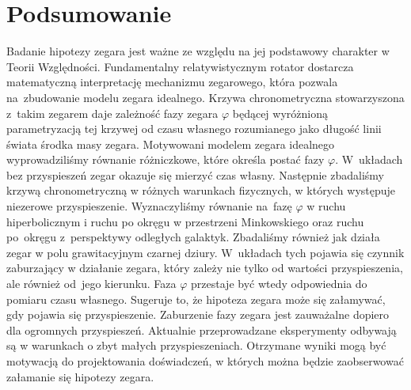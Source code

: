 \section{Podsumowanie}
Badanie hipotezy zegara jest ważne ze względu na jej 
podstawowy charakter w Teorii Względności. 
Fundamentalny relatywistycznym rotator dostarcza matematyczną 
interpretację mechanizmu zegarowego, która pozwala na~zbudowanie 
modelu zegara idealnego. Krzywa chronometryczna stowarzyszona z~takim 
zegarem daje zależność fazy zegara $\varphi$ będącej 
wyróżnioną parametryzacją tej krzywej od czasu własnego
rozumianego jako długość linii świata środka masy zegara.
Motywowani modelem zegara idealnego wyprowadziliśmy równanie różniczkowe, 
które określa postać fazy $\varphi$. 
W~układach bez przyspieszeń zegar okazuje się mierzyć czas własny. 
Następnie zbadaliśmy krzywą chronometryczną w różnych warunkach fizycznych,
w których występuje niezerowe przyspieszenie. Wyznaczyliśmy równanie na~fazę 
$\varphi$ w ruchu hiperbolicznym i 
ruchu po okręgu 
w przestrzeni Minkowskiego oraz
ruchu po~okręgu z~perspektywy odległych galaktyk. Zbadaliśmy
 również jak działa zegar w polu grawitacyjnym czarnej dziury.
W~układach tych pojawia się czynnik zaburzający w działanie zegara,
który zależy nie tylko od wartości przyspieszenia, ale również 
od~jego kierunku.
Faza $\varphi$ przestaje być wtedy odpowiednia do pomiaru 
 czasu własnego. Sugeruje to, że hipoteza zegara może 
się załamywać, gdy pojawia się przyspieszenie. 
Zaburzenie fazy zegara jest zauważalne dopiero dla
 ogromnych przyspieszeń.
Aktualnie przeprowadzane eksperymenty odbywają są w warunkach o zbyt małych 
przyspieszeniach. Otrzymane wyniki mogą być motywacją do projektowania 
doświadczeń, w których można będzie zaobserwować 
załamanie się hipotezy zegara.
